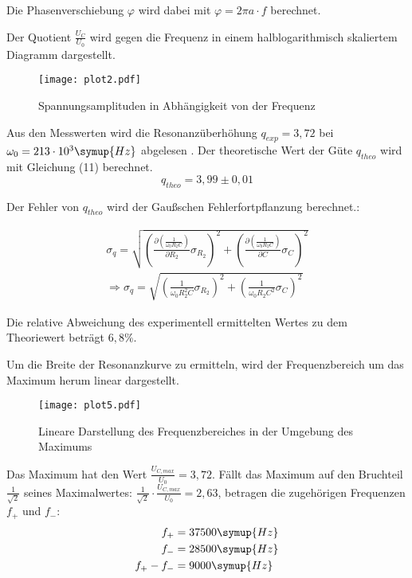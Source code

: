 Die Phasenverschiebung $\varphi$ wird dabei mit $\varphi = 2 \pi a \cdot f$ berechnet.


Der Quotient $\frac{U_C}{U_0}$ wird gegen die Frequenz in einem halblogarithmisch skaliertem Diagramm
dargestellt.


\begin{figure}[H]
  \centering
  \texttt{[image: plot2.pdf]}
  \caption{Spannungsamplituden in Abhängigkeit von der Frequenz}
  \label{fig:plot2}
\end{figure}

Aus den Messwerten wird die Resonanzüberhöhung $q_{exp} = 3,72$ bei $\omega_0 = 213 \cdot 10^{3} \symup{Hz}$ abgelesen . Der theoretische Wert der
Güte $q_{theo}$ wird mit Gleichung (11) berechnet.
\begin{equation*}
  q_{theo} = 3,99 \pm 0,01
\end{equation*}

Der Fehler von $q_{theo}$ wird der Gaußschen Fehlerfortpflanzung berechnet.:

\begin{align*}
  \sigma_q =  \sqrt{
      \left( \frac{\partial \left(\frac{1}{\omega_0 R_2C}\right)}{\partial R_2} \sigma_{R_2} \right)^{\!\! 2} +
      \left( \frac{\partial \left(\frac{1}{\omega_0 R_2C} \right)}{\partial C} \sigma_{C} \right)^{\!\! 2}
    } \\
    \Rightarrow \sigma_q = \sqrt{\left(\frac{1}{\omega_0 R_2^2 C}\sigma_{R_2} \right)^2 +
    \left(\frac{1}{\omega_0 R_2 C^2} \sigma_C \right)^2
    }
\end{align*}


Die relative Abweichung des experimentell ermittelten Wertes zu dem Theoriewert beträgt $6,8\%$.

Um die Breite der Resonanzkurve zu ermitteln, wird der Frequenzbereich um das Maximum herum linear dargestellt.

\begin{figure}[H]
  \centering
  \texttt{[image: plot5.pdf]}
  \caption{Lineare Darstellung des Frequenzbereiches in der Umgebung des Maximums}
  \label{fig:plot5}
\end{figure}

Das Maximum hat den Wert $\frac{U_{C,max}}{U_0} = 3,72$. Fällt das Maximum auf den Bruchteil $\frac{1}{\sqrt{2}}$ seines Maximalwertes:
$\frac{1}{\sqrt{2}} \cdot \frac{U_{C,max}}{U_0} = 2,63$, betragen
die zugehörigen Frequenzen $f_+$ und $f_-$:
\begin{align*}
  f_+ &= 37500 \symup{Hz} \\
  f_- &= 28500 \symup{Hz} \\
  f_+ - f_- &= 9000 \symup{Hz}
\end{align*}

